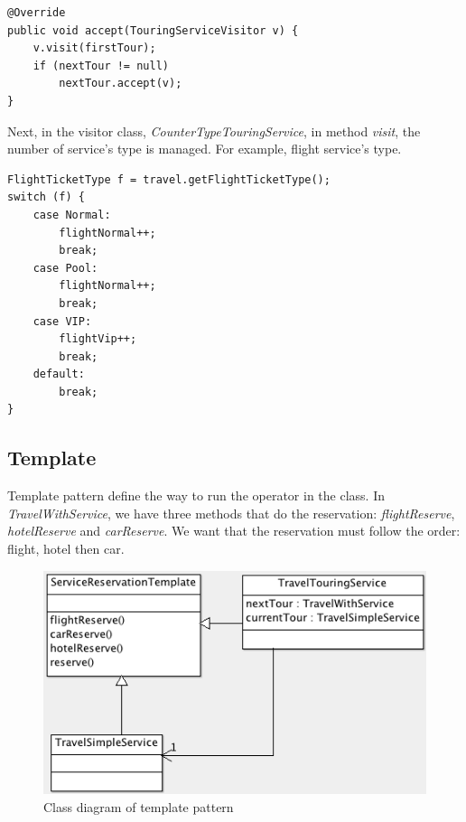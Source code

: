 \begin{lstlisting}
@Override
public void accept(TouringServiceVisitor v) {
	v.visit(firstTour);
	if (nextTour != null)
		nextTour.accept(v);
}
\end{lstlisting}

\newpage
Next, in the visitor class, \textit{CounterTypeTouringService}, in method \textit{visit}, the number of service's type is managed. For example, flight service's type.

\begin{lstlisting}
FlightTicketType f = travel.getFlightTicketType();
switch (f) {
	case Normal:
		flightNormal++;
		break;
	case Pool:
		flightNormal++;
		break;
	case VIP:
		flightVip++;
		break;
	default:
		break;
}

\end{lstlisting}

\newpage
\subsection{Template}

Template pattern define the way to run the operator in the class. In \textit{TravelWithService}, we have three methods that do the reservation: \textit{flightReserve}, \textit{hotelReserve} and \textit{carReserve}. We want that the reservation must follow the order: flight, hotel then car. 

\begin{figure}[h]
\centering
\includegraphics[width=12cm]{project/images/template.png}
\caption{Class diagram of template pattern}
\end{figure}
















